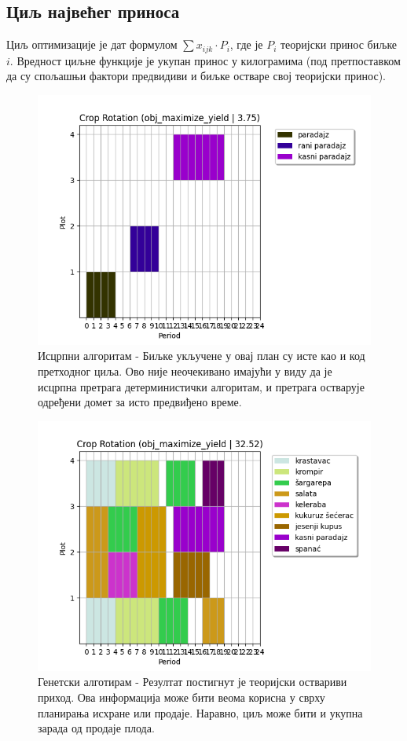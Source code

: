 \documentclass[12pt,fleqn]{article}
\begin{document}
\subsection{Циљ највећег приноса}
Циљ оптимизације је дат формулом $\sum x_{ijk} \cdot P_i$, где је $P_i$ теоријски принос биљке $i$. Вредност циљне функције је укупан принос у килограмима (под претпоставком да су спољашњи фактори предвидиви и биљке остваре свој теоријски принос).

\begin{figure}[H]
  \caption{Исцрпни алгоритам - Биљке укључене у овај план су исте као и код претходног циља. Ово није неочекивано имајући у виду да је исцрпна претрага детерминистички алгоритам, и претрага остварује одређени домет за исто предвиђено време.}
  \includegraphics[scale=1]{obj_maximize_yield_bf}\centering

\end{figure}

\begin{figure}[H]
  \caption{Генетски алготирам - Резултат постигнут је теоријски оствариви приход. Ова информација може бити веома корисна у сврху планирања исхране или продаје. Наравно, циљ може бити и укупна зарада од продаје плода.}
  \includegraphics[scale=1]{obj_maximize_yield_ga}\centering
\end{figure}
\end{document}
